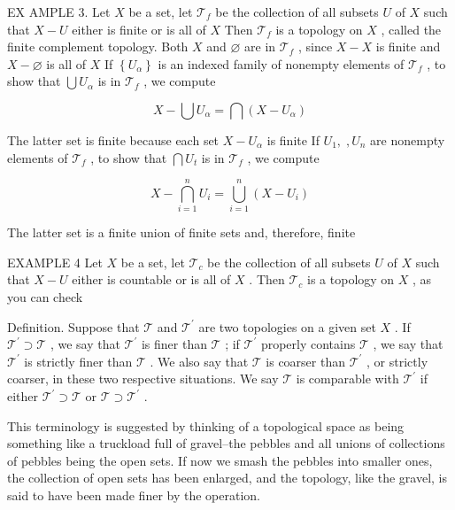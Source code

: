 EX AMPLE 3. Let \(X\) be a set, let \({\mathcal{T}}_{f}\) be the collection of all subsets \(U\) of \(X\) such that \(X - U\) either is finite or is all of \(X\) Then \({\mathcal{T}}_{f}\) is a topology on \(X\) , called the finite complement topology. Both \(X\) and \(\varnothing\) are in \({\mathcal{T}}_{f}\) , since \(X - X\) is finite and \(X - \varnothing\) is all of \(X\) If \(\left\{  {U}_{\alpha }\right\}\) is an indexed family of nonempty elements of \({\mathcal{T}}_{f}\) , to show that \(\bigcup {U}_{\alpha }\) is in \({\mathcal{T}}_{f}\) , we compute

\[
X - \bigcup {U}_{\alpha } = \bigcap \left( {X - {U}_{\alpha }}\right)
\]

The latter set is finite because each set \(X - {U}_{\alpha }\) is finite If \({U}_{1},\;,{U}_{n}\) are nonempty elements of \({\mathcal{T}}_{f}\) , to show that \(\bigcap {U}_{t}\) is in \({\mathcal{T}}_{f}\) , we compute

\[
X - \mathop{\bigcap }\limits_{{i = 1}}^{n}{U}_{i} = \mathop{\bigcup }\limits_{{i = 1}}^{n}\left( {X - {U}_{i}}\right)
\]

The latter set is a finite union of finite sets and, therefore, finite

EXAMPLE 4 Let \(X\) be a set, let \({\mathcal{T}}_{c}\) be the collection of all subsets \(U\) of \(X\) such that \(X - U\) either is countable or is all of \(X\) . Then \({\mathcal{T}}_{c}\) is a topology on \(X\) , as you can check

Definition. Suppose that \(\mathcal{T}\) and \({\mathcal{T}}^{\prime }\) are two topologies on a given set \(X\) . If \({\mathcal{T}}^{\prime } \supset  \mathcal{T}\) , we say that \({\mathcal{T}}^{\prime }\) is finer than \(\mathcal{T}\) ; if \({\mathcal{T}}^{\prime }\) properly contains \(\mathcal{T}\) , we say that \({\mathcal{T}}^{\prime }\) is strictly finer than \(\mathcal{T}\) . We also say that \(\mathcal{T}\) is coarser than \({\mathcal{T}}^{\prime }\) , or strictly coarser, in these two respective situations. We say \(\mathcal{T}\) is comparable with \({\mathcal{T}}^{\prime }\) if either \({\mathcal{T}}^{\prime } \supset  \mathcal{T}\) or \(\mathcal{T} \supset  {\mathcal{T}}^{\prime }\) .

This terminology is suggested by thinking of a topological space as being something like a truckload full of gravel--the pebbles and all unions of collections of pebbles being the open sets. If now we smash the pebbles into smaller ones, the collection of open sets has been enlarged, and the topology, like the gravel, is said to have been made finer by the operation.

